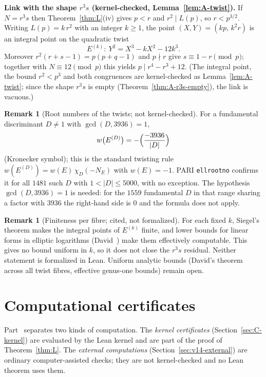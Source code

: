 \documentclass[11pt,reqno]{amsart}
\theoremstyle{definition}
\newtheorem{remark}[theorem]{Remark}
\begin{document}
\medskip
\noindent\textbf{Link with the shape \(r^3s\) (kernel-checked, Lemma~\ref{lem:A-twist}).} If \(N=r^3s\) then Theorem~\ref{thm:L}(iv) gives \(p<r\) and \(r^2\mid L(p)\), so \(r<p^{3/2}\). Writing \(L(p)=k\,r^2\) with an integer \(k\ge 1\), the point \((X,Y)=(kp,\,k^2r)\) is an integral point on the quadratic twist
\[
E^{(k)}\colon\ Y^2=X^3-kX^2-12k^3 .
\]
Moreover \(r^2(r+s-1)=p(p+q-1)\) and \(p\nmid r\) give \(s\equiv 1-r\pmod p\); together with \(N\equiv 12\pmod p\) this yields \(p\mid r^4-r^3+12\). (The integral point, the bound \(r^2<p^3\) and both congruences are kernel-checked as Lemma~\ref{lem:A-twist}; since the shape \(r^3s\) is empty (Theorem~\ref{thm:A-r3s-empty}), the link is vacuous.)

\begin{remark}[Root numbers of the twists; not kernel-checked]
For a fundamental discriminant \(D\ne 1\) with \(\gcd(D,3936)=1\),
\[
w\bigl(E^{(D)}\bigr)=-\Bigl(\frac{-3936}{|D|}\Bigr)
\]
(Kronecker symbol); this is the standard twisting rule \(w(E^{(D)})=w(E)\,\chi_D(-N_E)\) with \(w(E)=-1\). PARI \texttt{ellrootno} confirms it for all \(1481\) such \(D\) with \(1<|D|\le 5000\), with no exception. The hypothesis \(\gcd(D,3936)=1\) is needed: for the \(1559\) fundamental \(D\) in that range sharing a factor with \(3936\) the right-hand side is \(0\) and the formula does not apply.
\end{remark}

\begin{remark}[Finiteness per fibre; cited, not formalized]
For each fixed \(k\), Siegel's theorem makes the integral points of \(E^{(k)}\) finite, and lower bounds for linear forms in elliptic logarithms (David~\cite{David1995}) make them effectively computable. This gives no bound uniform in \(k\), so it does not close the \(r^3s\) residual. Neither statement is formalized in Lean. Uniform analytic bounds (David's theorem across all twist fibres, effective genus-one bounds) remain open.
\end{remark}

\part{Computational certificates}
\label{part:C}

Part~\ref{part:C} separates two kinds of computation. The \emph{kernel certificates} (Section~\ref{sec:C-kernel}) are evaluated by the Lean kernel and are part of the proof of Theorem~\ref{thm:L}. The \emph{external computations} (Section~\ref{sec:v14-external}) are ordinary computer-assisted checks; they are not kernel-checked and no Lean theorem uses them.
\end{document}
